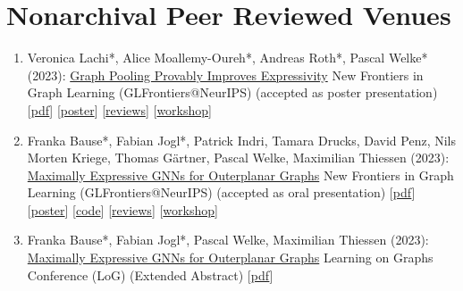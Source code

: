 \documentclass{scrartcl}
\begin{document}
\section{Nonarchival Peer Reviewed Venues}
\begin{enumerate}
\conti
\item
\label{lmrw2023graphpooling}
Veronica Lachi*, Alice Moallemy-Oureh*, Andreas Roth*, Pascal Welke* (2023):\newline
\href{https://openreview.net/forum?id=lR5NYB9zrv}{Graph Pooling Provably Improves Expressivity}\newline
New Frontiers in Graph Learning (GLFrontiers@NeurIPS)\newline
(accepted as poster presentation)\newline
{\footnotesize
[\href{https://pwelke.github.io/publications/lmrw2023pooling.pdf}{pdf}]
[\href{https://pwelke.github.io/publications/lmrw2023pooling-poster.pdf}{poster}]
[\href{https://openreview.net/forum?id=lR5NYB9zrv}{reviews}]
[\href{https://glfrontiers.github.io/}{workshop}]
}
\item
\label{bausejogl2023outerplanarglfrontiers}
Franka Bause*, Fabian Jogl*, Patrick Indri, Tamara Drucks, David Penz, Nils Morten Kriege, Thomas Gärtner, Pascal Welke, Maximilian Thiessen (2023):\newline
\href{https://openreview.net/pdf?id=dn87xnULwF}{Maximally Expressive GNNs for Outerplanar Graphs}\newline
New Frontiers in Graph Learning (GLFrontiers@NeurIPS)\newline
(accepted as oral presentation)\newline
{\footnotesize
[\href{https://pwelke.github.io/publications/bause2023outerplanarglfroniers.pdf}{pdf}]
[\href{https://pwelke.github.io/publications/bause2023outerplanar-poster.pdf}{poster}]
[\href{https://github.com/ocatias/outerplanarGNNs/}{code}]
[\href{https://openreview.net/forum?id=gXCqzpvhuD}{reviews}]
[\href{https://glfrontiers.github.io/}{workshop}]
}
\item
\label{bausejogl2023outerplanarlog}
Franka Bause*, Fabian Jogl*, Pascal Welke, Maximilian Thiessen (2023):\newline
\href{https://openreview.net/forum?id=7vyGCFTajk}{Maximally Expressive GNNs for Outerplanar Graphs}\newline
Learning on Graphs Conference (LoG)\newline
(Extended Abstract)\newline
{\footnotesize
[\href{https://pwelke.github.io/publications/bause2023outerplanarlog.pdf}{pdf}]
}
\end{enumerate}
\end{document}
